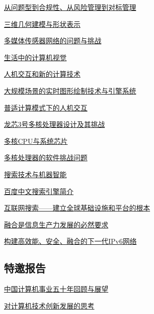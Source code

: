 \documentclass[a4paper]{article}
\begin{document}
\href{http://history.ccf.org.cn/resources/1190201776262/2010/04/15/011074.pdf}{从问题型到合规性、从风险管理到对标管理}

\href{http://history.ccf.org.cn/resources/1190201776262/2010/04/15/011075.pdf}{三维几何建模与形状表示}

\href{http://history.ccf.org.cn/resources/1190201776262/2010/04/15/011076.pdf}{多媒体传感器网络的问题与挑战}

\href{http://history.ccf.org.cn/resources/1190201776262/2010/04/15/011077.pdf}{生活中的计算机视觉}

\href{http://history.ccf.org.cn/resources/1190201776262/2010/04/15/011078.pdf}{人机交互和新的计算技术}

\href{http://history.ccf.org.cn/resources/1190201776262/2010/04/15/011079.pdf}{大规模场景的实时图形绘制技术与引擎系统}

\href{http://history.ccf.org.cn/resources/1190201776262/2010/04/15/011080.pdf}{普适计算模式下的人机交互}

\href{http://history.ccf.org.cn/resources/1190201776262/2010/04/15/011081.pdf}{龙芯3号多核处理器设计及其挑战}

\href{http://history.ccf.org.cn/resources/1190201776262/2010/04/15/011082.pdf}{多核CPU与系统芯片}

\href{http://history.ccf.org.cn/resources/1190201776262/2010/04/15/011083.pdf}{多核处理器的软件挑战问题}

\href{http://history.ccf.org.cn/resources/1190201776262/2010/04/15/011084.pdf}{搜索技术与机器智能}

\href{http://history.ccf.org.cn/resources/1190201776262/2010/04/15/011085.pdf}{百度中文搜索引擎简介}

\href{http://history.ccf.org.cn/resources/1190201776262/2010/04/15/011086.pdf}{互联网搜索——建立全球基础设施和平台的根本}

\href{http://history.ccf.org.cn/resources/1190201776262/2010/04/15/011087.pdf}{融合是信息生产力发展的必然要求}

\href{http://history.ccf.org.cn/resources/1190201776262/2010/04/15/011088.pdf}{构建高效能、安全、融合的下一代IPv6网络}

\subsection{特邀报告}
\href{http://history.ccf.org.cn/resources/1190201776262/2010/04/15/011010.pdf}{中国计算机事业五十年回顾与展望}

\href{http://history.ccf.org.cn/resources/1190201776262/2010/04/15/011016.pdf}{对计算机技术创新发展的思考}
\end{document}
